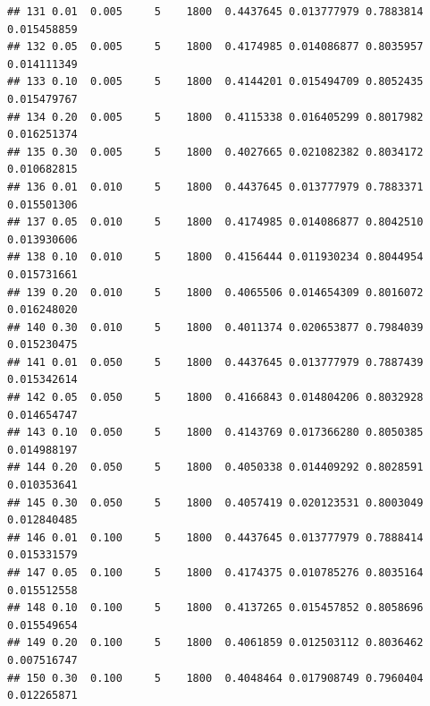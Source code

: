 \documentclass[
]{article}
\begin{document}
\begin{verbatim}
## 131 0.01  0.005     5    1800  0.4437645 0.013777979 0.7883814 0.015458859
## 132 0.05  0.005     5    1800  0.4174985 0.014086877 0.8035957 0.014111349
## 133 0.10  0.005     5    1800  0.4144201 0.015494709 0.8052435 0.015479767
## 134 0.20  0.005     5    1800  0.4115338 0.016405299 0.8017982 0.016251374
## 135 0.30  0.005     5    1800  0.4027665 0.021082382 0.8034172 0.010682815
## 136 0.01  0.010     5    1800  0.4437645 0.013777979 0.7883371 0.015501306
## 137 0.05  0.010     5    1800  0.4174985 0.014086877 0.8042510 0.013930606
## 138 0.10  0.010     5    1800  0.4156444 0.011930234 0.8044954 0.015731661
## 139 0.20  0.010     5    1800  0.4065506 0.014654309 0.8016072 0.016248020
## 140 0.30  0.010     5    1800  0.4011374 0.020653877 0.7984039 0.015230475
## 141 0.01  0.050     5    1800  0.4437645 0.013777979 0.7887439 0.015342614
## 142 0.05  0.050     5    1800  0.4166843 0.014804206 0.8032928 0.014654747
## 143 0.10  0.050     5    1800  0.4143769 0.017366280 0.8050385 0.014988197
## 144 0.20  0.050     5    1800  0.4050338 0.014409292 0.8028591 0.010353641
## 145 0.30  0.050     5    1800  0.4057419 0.020123531 0.8003049 0.012840485
## 146 0.01  0.100     5    1800  0.4437645 0.013777979 0.7888414 0.015331579
## 147 0.05  0.100     5    1800  0.4174375 0.010785276 0.8035164 0.015512558
## 148 0.10  0.100     5    1800  0.4137265 0.015457852 0.8058696 0.015549654
## 149 0.20  0.100     5    1800  0.4061859 0.012503112 0.8036462 0.007516747
## 150 0.30  0.100     5    1800  0.4048464 0.017908749 0.7960404 0.012265871
\end{verbatim}
\end{document}
